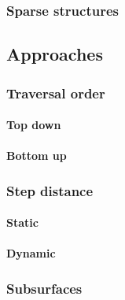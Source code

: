 \subsubsection{Sparse structures}

\subsection{Approaches}

\subsubsection{Traversal order}

\paragraph{Top down}

\paragraph{Bottom up}

\subsubsection{Step distance}

\paragraph{Static}

\paragraph{Dynamic}

\subsubsection{Subsurfaces}